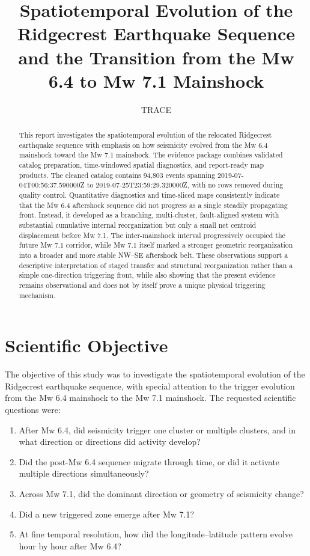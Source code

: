 \documentclass[11pt]{article}
\title{Spatiotemporal Evolution of the Ridgecrest Earthquake Sequence and the Transition from the Mw 6.4 to Mw 7.1 Mainshock}
\author{TRACE}
\date{}
\begin{document}
\maketitle

\begin{abstract}
This report investigates the spatiotemporal evolution of the relocated Ridgecrest earthquake sequence with emphasis on how seismicity evolved from the Mw 6.4 mainshock toward the Mw 7.1 mainshock. The evidence package combines validated catalog preparation, time-windowed spatial diagnostics, and report-ready map products. The cleaned catalog contains 94{,}803 events spanning 2019-07-04T00:56:37.590000Z to 2019-07-25T23:59:29.320000Z, with no rows removed during quality control. Quantitative diagnostics and time-sliced maps consistently indicate that the Mw 6.4 aftershock sequence did not progress as a single steadily propagating front. Instead, it developed as a branching, multi-cluster, fault-aligned system with substantial cumulative internal reorganization but only a small net centroid displacement before Mw 7.1. The inter-mainshock interval progressively occupied the future Mw 7.1 corridor, while Mw 7.1 itself marked a stronger geometric reorganization into a broader and more stable NW--SE aftershock belt. These observations support a descriptive interpretation of staged transfer and structural reorganization rather than a simple one-direction triggering front, while also showing that the present evidence remains observational and does not by itself prove a unique physical triggering mechanism.
\end{abstract}

\section{Scientific Objective}
The objective of this study was to investigate the spatiotemporal evolution of the Ridgecrest earthquake sequence, with special attention to the trigger evolution from the Mw 6.4 mainshock to the Mw 7.1 mainshock. The requested scientific questions were:
\begin{enumerate}[leftmargin=1.5em]
    \item After Mw 6.4, did seismicity trigger one cluster or multiple clusters, and in what direction or directions did activity develop?
    \item Did the post-Mw 6.4 sequence migrate through time, or did it activate multiple directions simultaneously?
    \item Across Mw 7.1, did the dominant direction or geometry of seismicity change?
    \item Did a new triggered zone emerge after Mw 7.1?
    \item At fine temporal resolution, how did the longitude--latitude pattern evolve hour by hour after Mw 6.4?
\end{enumerate}
\end{document}
